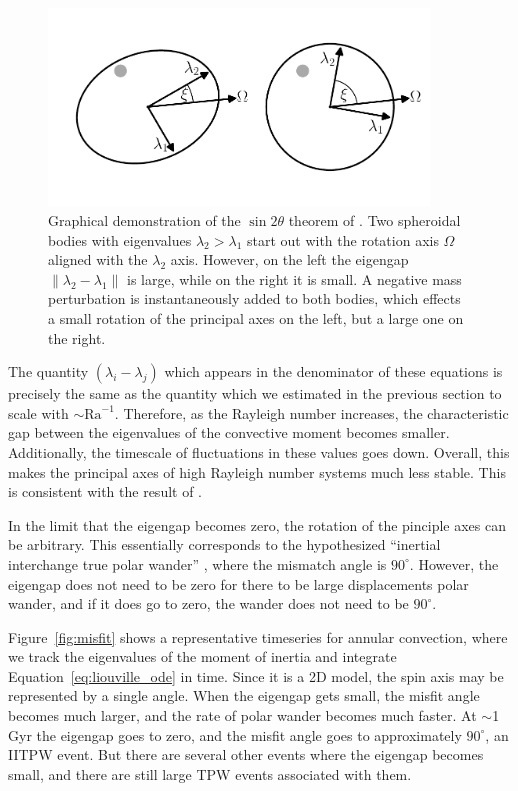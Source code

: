\documentclass[extra,mreferee]{gji}
\begin{document}
\begin{figure}
\centering
\includegraphics[width=0.9\textwidth]{figures/perturb.pdf}
\caption{Graphical demonstration of the $\sin{2 \theta}$ theorem of \citet{davis1970rotation}.  Two spheroidal bodies with eigenvalues $\lambda_2 > \lambda_1$ start out with the rotation axis $\Omega$ aligned with the $\lambda_2$ axis. However, on the left the eigengap $\lVert \lambda_2 - \lambda_1 \rVert$ is large, while on the right it is small.  A negative mass perturbation is instantaneously added to both bodies, which effects a small rotation of the principal axes on the left, but a large one on the right.}
\label{fig:perturb}
\end{figure}

The quantity $(\lambda_i-\lambda_j)$ which appears in the denominator of these equations is precisely the same as the quantity which we estimated in the previous section to scale with $\sim \mathrm{Ra}^{-1}$.
Therefore, as the Rayleigh number increases, the characteristic gap between the eigenvalues of the convective moment becomes smaller.  
Additionally, the timescale of fluctuations in these values goes down. 
Overall, this makes the principal axes of high Rayleigh number systems much less stable.
This is consistent with the result of \citet{richards1999polar}.

In the limit that the eigengap becomes zero, the rotation of the pinciple axes can be arbitrary. 
This essentially corresponds to the hypothesized ``inertial interchange true polar wander'' \citep{kirschvink1997evidence}, where 
the mismatch angle is $90^\circ$. However, the eigengap does not need to be zero for there to be large displacements polar wander, 
and if it does go to zero, the wander does not need to be $90^\circ$.

Figure~\ref{fig:misfit} shows a representative timeseries for annular convection, where 
we track the eigenvalues of the moment of inertia and integrate Equation~\eqref{eq:liouville_ode} in time.
Since it is a 2D model, the spin axis may be represented by a single angle.
When the eigengap gets small, the misfit angle becomes much larger, and the rate of polar wander becomes much faster.
At $\sim$1 Gyr the eigengap goes to zero, and the misfit angle goes to approximately $90^\circ$, 
an IITPW event. But there are several other events where the eigengap becomes small, and there are 
still large TPW events associated with them.
\end{document}
